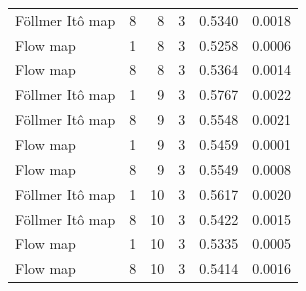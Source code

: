 \begin{tabular}{lrrrrr}
Föllmer Itô map & 8 & 8 & 3 & 0.5340 & 0.0018 \\
Flow map & 1 & 8 & 3 & 0.5258 & 0.0006 \\
Flow map & 8 & 8 & 3 & 0.5364 & 0.0014 \\
Föllmer Itô map & 1 & 9 & 3 & 0.5767 & 0.0022 \\
Föllmer Itô map & 8 & 9 & 3 & 0.5548 & 0.0021 \\
Flow map & 1 & 9 & 3 & 0.5459 & 0.0001 \\
Flow map & 8 & 9 & 3 & 0.5549 & 0.0008 \\
Föllmer Itô map & 1 & 10 & 3 & 0.5617 & 0.0020 \\
Föllmer Itô map & 8 & 10 & 3 & 0.5422 & 0.0015 \\
Flow map & 1 & 10 & 3 & 0.5335 & 0.0005 \\
Flow map & 8 & 10 & 3 & 0.5414 & 0.0016 \\
\bottomrule
\end{tabular}

